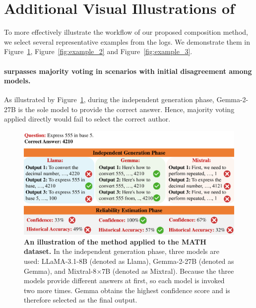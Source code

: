\section{Additional Visual Illustrations of \NAME{}}
\label{sec:visual}

To more effectively illustrate the workflow of our proposed composition method, we select several representative examples from the logs. We demonstrate them in Figure~\ref{fig:example_1}, Figure~\ref{fig:example_2} and Figure~\ref{fig:example_3}.

\paragraph{\NAME{} surpasses majority voting in scenarios with initial disagreement among models.} As illustrated by Figure~\ref{fig:example_1}, during the independent generation phase, Gemma-2-27B is the sole model to provide the correct answer. Hence, majority voting applied directly would fail to select the correct author. 


\begin{figure}[ht]
    \centering
    \includegraphics[width=0.7\linewidth]{Figures/example_1_cropped.pdf}
    \caption{\textbf{An illustration of the \NAME{} method applied to the MATH dataset.} In the independent generation phase, three models are used: LLaMA-3.1-8B (denoted as Llama), Gemma-2-27B (denoted as Gemma), and Mixtral-8$\times$7B (denoted as Mixtral). Because the three models provide different answers at first, so each model is invoked two more times. Gemma obtains the highest confidence score and is therefore selected as the final output.}
    \label{fig:example_1}
\end{figure}

